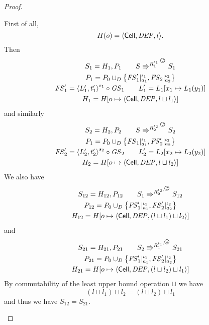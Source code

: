 \begin{proof}
\begin{description}
      First of all,
      \begin{equation}
        H(o) = \mbox{$\langle \mbox{$\mathsf{Cell}$}{}, \mathit{DEP}, l \rangle$}.
      \end{equation}
      Then
      \begin{equation}
        \begin{gathered}
          S_1 = H_1, P_1 \andalso S \Rrightarrow^{R_1^{\iota_1, \smiley}} S_1
          \\
          P_1 = P_0 \cup_D \left\{ \FS'_1|_{a_1}^{\iota_1},
          \FS_2|_{a_2}^{\iota_2} \right\} \\
          \FS'_1 = \xframe{L'_1, t'_1}^{s_1} \circ \GS_1  \andalso L'_1 = L_1[x_1 \mapsto
          L_1(y_1)] \\
          H_1 = H[o \mapsto \Cell{\DEP, l \sqcup l_1}]
        \end{gathered}
      \end{equation}
      and similarly
      \begin{equation}
        \begin{gathered}
          S_2 = H_2, P_2 \andalso S \Rrightarrow^{R_2^{\iota_2, \smiley}} S_2
          \\
          P_1 = P_0 \cup_D \left\{ \FS_1|_{a_1}^{\iota_1},
          \FS'_2|_{a_2}^{\iota_2} \right\} \\
          \FS'_2 = \xframe{L'_2, t'_2}^{s_2} \circ \GS_2  \andalso L'_2 = L_2[x_2 \mapsto
          L_2(y_2)] \\
          H_2 = H[o \mapsto \Cell{\DEP, l \sqcup l_2}]
        \end{gathered}
      \end{equation}
      We also have
      \begin{equation}
        \begin{gathered}
          S_{12} = H_{12}, P_{12} \andalso S_1 \Rrightarrow^{R_2^{\iota_2,
          \smiley}} S_{12}
          \\
          P_{12} = P_0 \cup_D \left\{ \FS'_1|_{a_1}^{\iota_1},
          \FS'_2|_{a_2}^{\iota_2} \right\} \\
          H_{12} = H[o \mapsto \Cell{\DEP, (l \sqcup l_1) \sqcup l_2}]
        \end{gathered}
      \end{equation}
      and
      \begin{equation}
        \begin{gathered}
          S_{21} = H_{21}, P_{21} \andalso S_2 \Rrightarrow^{R_1^{\iota_1,
          \smiley}} S_{21}
          \\
          P_{21} = P_0 \cup_D \left\{ \FS'_1|_{a_1}^{\iota_1},
          \FS'_2|_{a_2}^{\iota_2} \right\} \\
          H_{21} = H[o \mapsto \Cell{\DEP, (l \sqcup l_2) \sqcup l_1}]
        \end{gathered}
      \end{equation}
      By commutability of the least upper bound operation $\sqcup$ we have
      \begin{equation}
        (l \sqcup l_1) \sqcup l_2 = (l \sqcup l_2) \sqcup l_1
      \end{equation}
      and thus we have $S_{12} = S_{21}$.


\end{description}
\end{proof}
